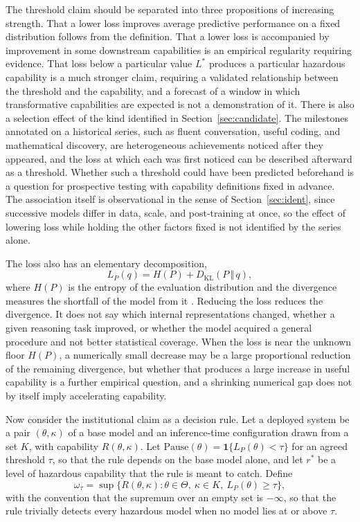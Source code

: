 \documentclass[11pt]{article}
\theoremstyle{definition}
\theoremstyle{remark}
\begin{document}
The threshold claim should be separated into three propositions of increasing strength. That a lower loss improves average predictive performance on a fixed distribution follows from the definition. That a lower loss is accompanied by improvement in some downstream capabilities is an empirical regularity requiring evidence. That loss below a particular value $L^{*}$ produces a particular hazardous capability is a much stronger claim, requiring a validated relationship between the threshold and the capability, and a forecast of a window in which transformative capabilities are expected is not a demonstration of it. There is also a selection effect of the kind identified in Section~\ref{sec:candidate}. The milestones annotated on a historical series, such as fluent conversation, useful coding, and mathematical discovery, are heterogeneous achievements noticed after they appeared, and the loss at which each was first noticed can be described afterward as a threshold. Whether such a threshold could have been predicted beforehand is a question for prospective testing with capability definitions fixed in advance. The association itself is observational in the sense of Section~\ref{sec:ident}, since successive models differ in data, scale, and post-training at once, so the effect of lowering loss while holding the other factors fixed is not identified by the series alone.

The loss also has an elementary decomposition,
\begin{equation}
L_P(q)=H(P)+D_{\mathrm{KL}}(P\,\Vert\,q),
\end{equation}
where $H(P)$ is the entropy of the evaluation distribution and the divergence measures the shortfall of the model from it \citep{cover2006}. Reducing the loss reduces the divergence. It does not say which internal representations changed, whether a given reasoning task improved, or whether the model acquired a general procedure and not better statistical coverage. When the loss is near the unknown floor $H(P)$, a numerically small decrease may be a large proportional reduction of the remaining divergence, but whether that produces a large increase in useful capability is a further empirical question, and a shrinking numerical gap does not by itself imply accelerating capability.

Now consider the institutional claim as a decision rule. Let a deployed system be a pair $(\theta,\kappa)$ of a base model and an inference-time configuration drawn from a set $K$, with capability $R(\theta,\kappa)$. Let $\mathrm{Pause}(\theta)=\mathbf 1\{L_P(\theta)<\tau\}$ for an agreed threshold $\tau$, so that the rule depends on the base model alone, and let $r^{*}$ be a level of hazardous capability that the rule is meant to catch. Define
\begin{equation}
\omega_\tau=\sup\{R(\theta,\kappa):\theta\in\Theta,\ \kappa\in K,\ L_P(\theta)\ge\tau\},
\end{equation}
with the convention that the supremum over an empty set is $-\infty$, so that the rule trivially detects every hazardous model when no model lies at or above $\tau$.
\end{document}
